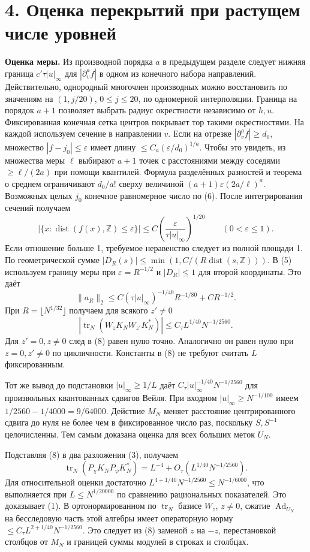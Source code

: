 \documentclass[11pt,a4paper]{article}
\newcommand{\Ad}{\operatorname{Ad}}
\newcommand{\dist}{\operatorname{dist}}
\newcommand{\Z}{\mathbb Z}
\newcommand{\sect}[1]{\section*{\sffamily\color{ink}#1}}
\newcommand{\subt}[1]{\par\medskip\noindent\textbf{#1.}\quad}
\begin{document}
\newpage
\sect{4. Оценка перекрытий при растущем числе уровней}
\subt{Оценка меры}
Из производной порядка \(a\) в предыдущем разделе следует нижняя граница \(c'\tau|u|_\infty\) для \(|\partial_v^a f|\) в одном из конечного набора направлений. Действительно, однородный многочлен производных можно восстановить по значениям на \((1,j/20)\), \(0\le j\le20\), по одномерной интерполяции. Граница на порядок \(a+1\) позволяет выбрать радиус окрестности независимо от \(h,u\). Фиксированная конечная сетка центров покрывает тор такими окрестностями. На каждой используем сечение в направлении \(v\). Если на отрезке \(|\partial_v^a f|\ge d_0\), множество \(|f-j_0|\le\varepsilon\) имеет длину \(\le C_a(\varepsilon/d_0)^{1/a}\). Чтобы это увидеть, из множества меры \(\ell\) выбирают \(a+1\) точек с расстояниями между соседями \(\ge\ell/(2a)\) при помощи квантилей. Формула разделённых разностей и теорема о среднем ограничивают \(d_0/a!\) сверху величиной \((a+1)\varepsilon(2a/\ell)^a\). Возможных целых \(j_0\) конечное равномерное число по (6). После интегрирования сечений получаем
\[
   |\{x:\dist(f(x),\Z)\le\varepsilon\}|
         \le C\left(\frac{\varepsilon}{\tau |u|_\infty}\right)^{1/20}
         \qquad (0<\varepsilon\le1).
\]
Если отношение больше 1, требуемое неравенство следует из полной площади 1. По геометрической сумме \(|D_R(s)|\le\min(1,C/(R\dist(s,\Z)))\). В (5) используем границу меры при \(\varepsilon=R^{-1/2}\) и \(|D_R|\le1\) для второй координаты. Это даёт
\[
  \|a_R\|_2\le C(\tau|u|_\infty)^{-1/40}R^{-1/80}+CR^{-1/2}.
\]
При \(R=\lfloor N^{1/32}\rfloor\) получаем для всякого \(z'\ne0\)
\begin{equation}
   |\operatorname{tr}_N(W_z K_N W_{z'}K_N^*)|
                 \le C_\tau L^{1/40}N^{-1/2560}.                  \tag{8}
\end{equation}
Для \(z'=0,z\ne0\) след в (8) равен нулю точно. Аналогично он равен нулю при \(z=0,z'\ne0\) по цикличности. Константы в (8) не требуют считать \(L\) фиксированным.

Тот же вывод до подстановки \(|u|_\infty\ge1/L\) даёт \(C_\tau |u|_\infty^{-1/40}N^{-1/2560}\) для произвольных квантованных сдвигов Вейля. При входном \(|u|_\infty\ge N^{-1/100}\) имеем \(1/2560-1/4000=9/64000\). Действие \(M_N\) меняет расстояние центрированного сдвига до нуля не более чем в фиксированное число раз, поскольку \(S,S^{-1}\) целочисленны. Тем самым доказана оценка для всех больших меток \(U_N\).

Подставляя (8) в два разложения (3), получаем
\[
 \operatorname{tr}_N(P_\chi K_N P_\psi K_N^*)
       =L^{-4}+O_\tau(L^{1/40}N^{-1/2560}).
\]
Для относительной оценки достаточно \(L^{4+1/40}N^{-1/2560}\le N^{-1/6000}\), что выполняется при \(L\le N^{1/20000}\) по сравнению рациональных показателей. Это доказывает (1). В ортонормированном по \(\operatorname{tr}_N\) базисе \(W_z\), \(z\ne0\), сжатие \(\Ad_{U_N}\) на бесследовую часть этой алгебры имеет операторную норму \(\le C_\tau L^{2+1/40}N^{-1/2560}\). Это следует из (8) заменой \(z\) на \(-z\), перестановкой столбцов от \(M_N\) и границей суммы модулей в строках и столбцах.
\end{document}
